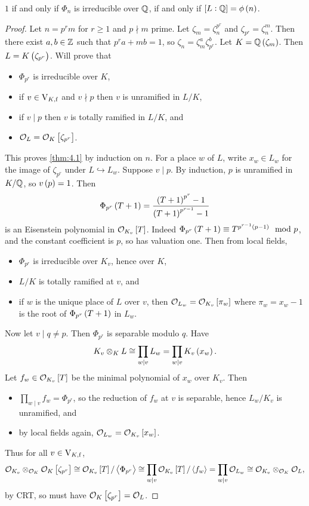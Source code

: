 \begin{remark*}
$ 1 $ if and only if $ \Phi_n $ is irreducible over $ \mathbb{Q} $, if and only if $ \sbr{L : \QQ} = \phi\br{n} $.
\end{remark*}

\begin{proof}
Let $ n = p^rm $ for $ r \ge 1 $ and $ p \nmid m $ prime. Let $ \zeta_m = \zeta_n^{p^r} $ and $ \zeta_{p^r} = \zeta_n^m $. Then there exist $ a, b \in \mathbb{Z} $ such that $ p^ra + mb = 1 $, so $ \zeta_n = \zeta_m^a\zeta_{p^r}^b $. Let $ K = \QQ\br{\zeta_m} $. Then $ L = K\br{\zeta_{p^r}} $. Will prove that
\begin{itemize}
\item $ \Phi_{p^r} $ is irreducible over $ K $,
\item if $ v \in \mathrm{V}_{K, \mathrm{f}} $ and $ v \nmid p $ then $ v $ is unramified in $ L / K $,
\item if $ v \mid p $ then $ v $ is totally ramified in $ L / K $, and
\item $ \OOO_L = \OOO_K\sbr{\zeta_{p^r}} $.
\end{itemize}
This proves \ref{thm:4.1} by induction on $ n $. For a place $ w $ of $ L $, write $ x_w \in L_w $ for the image of $ \zeta_{p^r} $ under $ L \hookrightarrow L_w $. Suppose $ v \mid p $. By induction, $ p $ is unramified in $ K / \mathbb{Q} $, so $ v\br{p} = 1 $. Then
$$ \Phi_{p^r}\br{T + 1} = \dfrac{\br{T + 1}^{p^r} - 1}{\br{T + 1}^{p^{r - 1}} - 1} $$
is an Eisenstein polynomial in $ \OOO_{K_v}\sbr{T} $. Indeed $ \Phi_{p^r}\br{T + 1} \equiv T^{p^{r - 1}\br{p - 1}} \mod p $, and the constant coefficient is $ p $, so has valuation one. Then from local fields,
\begin{itemize}
\item $ \Phi_{p^r} $ is irreducible over $ K_v $, hence over $ K $,
\item $ L / K $ is totally ramified at $ v $, and
\item if $ w $ is the unique place of $ L $ over $ v $, then $ \OOO_{L_w} = \OOO_{K_v}\sbr{\pi_w} $ where $ \pi_w = x_w - 1 $ is the root of $ \Phi_{p^r}\br{T + 1} $ in $ L_w $.
\end{itemize}
Now let $ v \mid q \ne p $. Then $ \Phi_{p^r} $ is separable modulo $ q $. Have
$$ K_v \otimes_K L \cong \prod_{w \mid v} L_w = \prod_{w \mid v} K_v\br{x_w}. $$
Let $ f_w \in \OOO_{K_v}\sbr{T} $ be the minimal polynomial of $ x_w $ over $ K_v $. Then
\begin{itemize}
\item $ \prod_{w \mid v} f_w = \Phi_{p^r} $, so the reduction of $ f_w $ at $ v $ is separable, hence $ L_w / K_v $ is unramified, and
\item by local fields again, $ \OOO_{L_w} = \OOO_{K_v}\sbr{x_w} $.
\end{itemize}
Thus for all $ v \in \mathrm{V}_{K, \mathrm{f}} $,
$$ \OOO_{K_v} \otimes_{\OOO_K} \OOO_K\sbr{\zeta_{p^r}} \cong \OOO_{K_v}\sbr{T} / \abr{\Phi_{p^r}} \cong \prod_{w \mid v} \OOO_{K_v}\sbr{T} / \abr{f_w} = \prod_{w \mid v} \OOO_{L_w} \cong \OOO_{K_v} \otimes_{\OOO_K} \OOO_L, $$
by CRT, so must have $ \OOO_K\sbr{\zeta_{p^r}} = \OOO_L $.
\end{proof}

